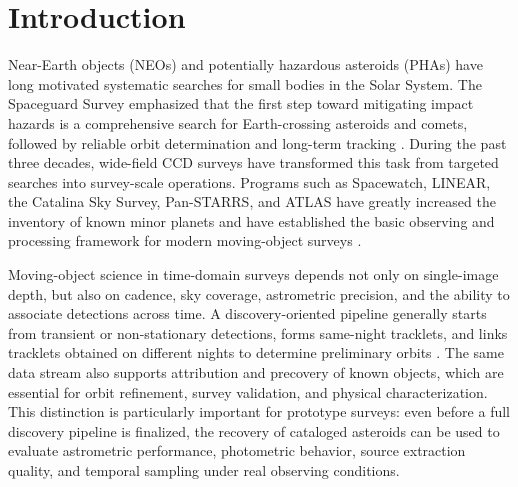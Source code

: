 \documentclass[referee]{raa}
\begin{document}

\maketitle

\section{Introduction}
\label{sec:intro}

Near-Earth objects (NEOs) and potentially hazardous asteroids (PHAs) have long motivated systematic searches for small bodies in the Solar System. The Spaceguard Survey emphasized that the first step toward mitigating impact hazards is a comprehensive search for Earth-crossing asteroids and comets, followed by reliable orbit determination and long-term tracking \citep{Morrison1992}. During the past three decades, wide-field CCD surveys have transformed this task from targeted searches into survey-scale operations. Programs such as Spacewatch, LINEAR, the Catalina Sky Survey, Pan-STARRS, and ATLAS have greatly increased the inventory of known minor planets and have established the basic observing and processing framework for modern moving-object surveys \citep[e.g.][]{Stokes2000,Larsen2007,Larson2003,Denneau2013,Tonry2018}.

Moving-object science in time-domain surveys depends not only on single-image depth, but also on cadence, sky coverage, astrometric precision, and the ability to associate detections across time. A discovery-oriented pipeline generally starts from transient or non-stationary detections, forms same-night tracklets, and links tracklets obtained on different nights to determine preliminary orbits \citep{Kubica2007,Denneau2013,Veres2017}. The same data stream also supports attribution and precovery of known objects, which are essential for orbit refinement, survey validation, and physical characterization. This distinction is particularly important for prototype surveys: even before a full discovery pipeline is finalized, the recovery of cataloged asteroids can be used to evaluate astrometric performance, photometric behavior, source extraction quality, and temporal sampling under real observing conditions.
\end{document}
